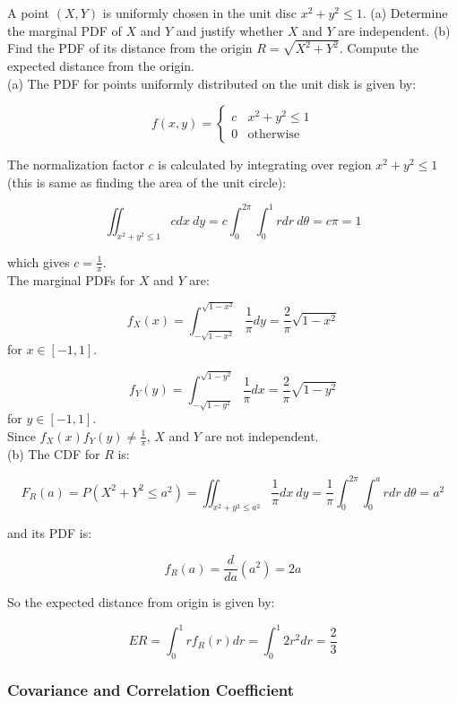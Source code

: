 \documentclass[12pt, a4paper]{article}
\newcounter{exa}
\begin{document}
\begin{texample}
A point $(X,Y)$ is uniformly chosen in the unit disc $x^2+y^2\leq 1$. (a) Determine the marginal PDF of $X$ and $Y$ and justify whether $X$ and $Y$ are independent. (b) Find the PDF of its distance from the origin $R = \sqrt{X^2+Y^2}$. Compute the expected distance from the origin. \\

(a) The PDF for points uniformly distributed on the unit disk is given by:

$$
f(x,y)=\begin{cases}
c & x^2+y^2\leq 1 \\
0 & \text{otherwise}
\end{cases}
$$

The normalization factor $c$ is calculated by integrating over region $x^2+y^2\leq 1$ (this is same as finding the area of the unit circle):

\[\iint_{x^2+y^2\leq 1} c dx\:dy = c\int_0^{2\pi}\int_0^1 rdr\:d\theta=c\pi=1 \]

which gives $c=\frac{1}{\pi}$. \\

The marginal PDFs for $X$ and $Y$ are:

\[f_X(x)=\int_{-\sqrt{1-x^2}}^{\sqrt{1-x^2}} \frac{1}{\pi} dy = \frac{2}{\pi} \sqrt{1-x^2} \] for $x\in[-1,1]$.

\[f_Y(y)=\int_{-\sqrt{1-y^2}}^{\sqrt{1-y^2}} \frac{1}{\pi} dx = \frac{2}{\pi} \sqrt{1-y^2} \] for $y\in[-1,1]$. \\

Since $f_X(x)f_Y(y)\ne\frac{1}{\pi}$, $X$ and $Y$ are not independent. \\

(b) The CDF for $R$ is:

\[F_R(a)=P(X^2+Y^2\le a^2)=\iint_{x^2+y^2\leq a^2} \frac{1}{\pi} dx\:dy=\frac{1}{\pi}\int_0^{2\pi}\int_0^a rdr\:d\theta=a^2\]

and its PDF is:

\[f_R(a)=\frac{d}{da}(a^2)=2a\]

So the expected distance from origin is given by:

\[ER=\int_0^1 rf_R(r)dr=\int_0^1 2r^2dr=\frac23\]
\end{texample}

\subsubsection{Covariance and Correlation Coefficient}
\end{document}
